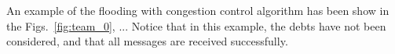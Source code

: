 \begin{notex}
  
  \begin{figure*}
  \end{figure*}

  \begin{figure*}
  \end{figure*}
  
  \begin{figure*}
  \end{figure*}

  \begin{figure*}
  \end{figure*}

  \begin{figure*}
  \end{figure*}

  \begin{figure*}
  \end{figure*}

  \begin{figure*}
  \end{figure*}

  \begin{figure*}
  \end{figure*}

  \begin{figure*}
  \end{figure*}

\end{notex}

An example of the flooding with congestion control algorithm has been
show in the Figs.~\ref{fig:team_0}, ... Notice that in this example,
the debts have not been considered, and that all messages are received
successfully.

\begin{comment}
In each round, peers check if a chunk have been received from the rest
of peers of the team (${\cal P}_k\in {\cal T}_j)$). If not, peers send
a $[\mathtt{propagate}~{\cal P}_i]$ to one or more (possibly
to the rest of) peers of the team, where ${\cal P}_i$ is the origin peer
of the missing chunk. At this point, the process continues as
described in Section~\ref{dbs:chunk_flooding}.
\end{comment}

